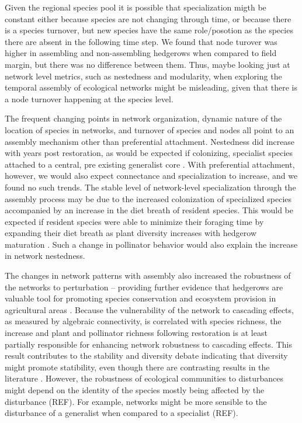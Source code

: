 \documentclass[12pt]{article}
\begin{document}
Given the regional species pool it is possible that specialization migth be constant either because species are not changing through time, or because there is a species turnover, but new species have the same role/posotion as the species there are absent in the following time step. We found that node turover was higher in assembling and non-assembling hedgerows when compared to field margin, but there was no difference between them. Thus, maybe looking just at network level metrics, such as nestedness and modularity, when exploring the temporal assembly of ecological networks might be misleading, given that there is a node turnover happening at the species level. 

The frequent changing points in network organization, dynamic nature
of the location of species in networks, and turnover of species and
nodes all point to an assembly mechanism other than preferential
attachment. Nestedness did increase with years post restoration, as
would be expected if colonizing, specialist species attached to a
central, pre existing generalist core \cite{albrecht2010plant}. With preferential
attachment, however, we would also expect connectance and
specialization to increase, and we found no such trends. The stable level
of network-level specialization through the assembly process may be
due to the increased colonization of specialized species
\citep{mgonigle-2015-x} accompanied by an increase in the diet breath
of resident species. This would be expected if resident species were
able to minimize their foraging time by expanding their diet breath as
plant diversity increases with hedgerow maturation \citep{Waser1996,
  pyke1984optimal, Bluthgen2007, albrecht2010plant}. Such a change in
pollinator behavior would also explain the increase in network
nestedness.

The changes in network patterns with assembly also increased the
robustness of the networks to perturbation -- providing further
evidence that hedgerows are valuable tool for promoting species
conservation and ecosystem provision in agricultural areas
\citep{mgonigle-2015-x, ponisio2015farm, kremen-2015-602}. Because the
vulnerability of the network to cascading effects, as
measured by algebraic connectivity, is correlated with species
richness, the increase and plant and pollinator richness following
restoration is at least partially responsible for enhancing network
robustness to cascading effects. This result contributes to the stability and diversity debate indicating that diversity might promote statibility, even though there are contrasting results in the literature \citep [e.g.][]{may1972will, pimm1984complexity, montoya2006ecological}. However, the robustness of ecological communities to disturbances  might depend on the identity of the species mostly being affected by the disturbance (REF). For example, networks might be more sensible to the disturbance of a generalist when compared to a specialist (REF).
\end{document}
